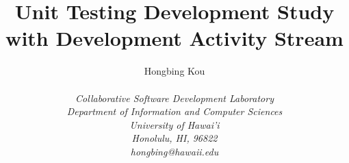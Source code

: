 \documentclass[11pt,twocolumn]{article}
\begin{document}
\title{Unit Testing Development Study with Development Activity Stream}
\author{\protect\begin{tabular}{ccc}
Hongbing Kou\\
\end{tabular}\\
\em Collaborative Software Development Laboratory\\
\em Department of Information and Computer Sciences\\
\em University of Hawai'i\\
\em Honolulu, HI, 96822\\
\em hongbing@hawaii.edu}
\maketitle
\thispagestyle{empty}
\end{document}
